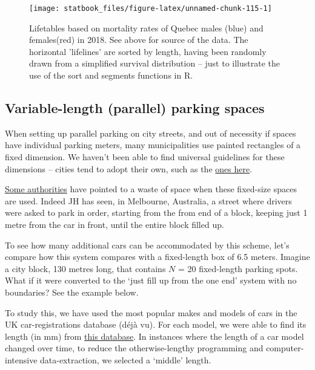 \documentclass[]{book}
\begin{document}
\begin{figure}

{\centering \texttt{[image: statbook\_files/figure-latex/unnamed-chunk-115-1]} 

}

\caption{Lifetables based on mortality rates of Quebec males (blue) and females(red) in 2018. See above for source of the data. The horizontal 'lifelines' are sorted by length, having been randomly drawn from a simplified survival distribution -- just to illustrate the use of the sort and segments functions in R.}\label{fig:unnamed-chunk-115}
\end{figure}

\hypertarget{variable-length-parallel-parking-spaces}{%
\subsection{Variable-length (parallel) parking spaces}\label{variable-length-parallel-parking-spaces}}

When setting up parallel parking on city streets, and out of necessity if spaces have individual parking meters, many municipalities use painted rectangles of a fixed dimension.
We haven't been able to find universal guidelines for these dimensions -- cities tend to adopt their own, such as the \href{https://www.rochford.gov.uk/sites/default/files/planning_parking_standards_design_and_good_practice.pdf}{ones here}.

\href{http://www.portphillip.vic.gov.au/line-marking-parking-spaces.htm}{Some authorities} have pointed to a waste of space when these fixed-size spaces are used. Indeed JH has seen, in Melbourne, Australia, a street where drivers were asked to park in order, starting from the from end of a block, keeping just 1 metre from the car in front, until the entire block filled up.

To see how many additional cars can be accommodated by this scheme, let's compare how this system compares with a fixed-length box of 6.5 meters. Imagine a city block, 130 metres long, that contains \(N\) = 20 fixed-length parking spots. What if it were converted to the `just fill up from the one end' system with no boundaries? See the example below.

To study this, we have used the most popular makes and models of cars in the UK car-registrations database (déjà vu). For each model, we were able to find its length (in mm) from \href{https://www.cars-data.com/en/}{this database}. In instances where the length of a car model changed over time, to reduce the otherwise-lengthy programming and computer-intensive data-extraction, we selected a `middle' length.
\end{document}
